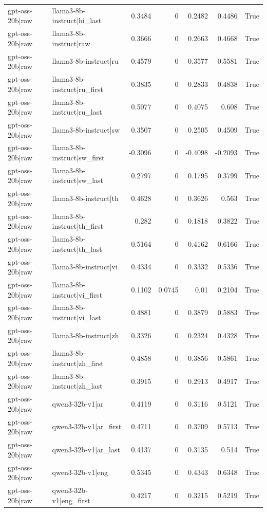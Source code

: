 \begin{table}
\begin{tabular}{l l r r r r l}
gpt-oss-20b|raw & llama3-8b-instruct|hi_last & 0.3484 & 0 & 0.2482 & 0.4486 & True \\
gpt-oss-20b|raw & llama3-8b-instruct|raw & 0.3666 & 0 & 0.2663 & 0.4668 & True \\
gpt-oss-20b|raw & llama3-8b-instruct|ru & 0.4579 & 0 & 0.3577 & 0.5581 & True \\
gpt-oss-20b|raw & llama3-8b-instruct|ru_first & 0.3835 & 0 & 0.2833 & 0.4838 & True \\
gpt-oss-20b|raw & llama3-8b-instruct|ru_last & 0.5077 & 0 & 0.4075 & 0.608 & True \\
gpt-oss-20b|raw & llama3-8b-instruct|sw & 0.3507 & 0 & 0.2505 & 0.4509 & True \\
gpt-oss-20b|raw & llama3-8b-instruct|sw_first & -0.3096 & 0 & -0.4098 & -0.2093 & True \\
gpt-oss-20b|raw & llama3-8b-instruct|sw_last & 0.2797 & 0 & 0.1795 & 0.3799 & True \\
gpt-oss-20b|raw & llama3-8b-instruct|th & 0.4628 & 0 & 0.3626 & 0.563 & True \\
gpt-oss-20b|raw & llama3-8b-instruct|th_first & 0.282 & 0 & 0.1818 & 0.3822 & True \\
gpt-oss-20b|raw & llama3-8b-instruct|th_last & 0.5164 & 0 & 0.4162 & 0.6166 & True \\
gpt-oss-20b|raw & llama3-8b-instruct|vi & 0.4334 & 0 & 0.3332 & 0.5336 & True \\
gpt-oss-20b|raw & llama3-8b-instruct|vi_first & 0.1102 & 0.0745 & 0.01 & 0.2104 & True \\
gpt-oss-20b|raw & llama3-8b-instruct|vi_last & 0.4881 & 0 & 0.3879 & 0.5883 & True \\
gpt-oss-20b|raw & llama3-8b-instruct|zh & 0.3326 & 0 & 0.2324 & 0.4328 & True \\
gpt-oss-20b|raw & llama3-8b-instruct|zh_first & 0.4858 & 0 & 0.3856 & 0.5861 & True \\
gpt-oss-20b|raw & llama3-8b-instruct|zh_last & 0.3915 & 0 & 0.2913 & 0.4917 & True \\
gpt-oss-20b|raw & qwen3-32b-v1|ar & 0.4119 & 0 & 0.3116 & 0.5121 & True \\
gpt-oss-20b|raw & qwen3-32b-v1|ar_first & 0.4711 & 0 & 0.3709 & 0.5713 & True \\
gpt-oss-20b|raw & qwen3-32b-v1|ar_last & 0.4137 & 0 & 0.3135 & 0.514 & True \\
gpt-oss-20b|raw & qwen3-32b-v1|eng & 0.5345 & 0 & 0.4343 & 0.6348 & True \\
gpt-oss-20b|raw & qwen3-32b-v1|eng_first & 0.4217 & 0 & 0.3215 & 0.5219 & True \\

\end{tabular}
\end{table}
